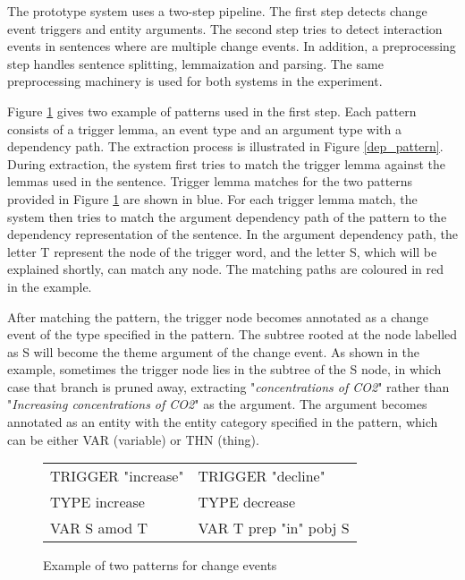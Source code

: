 The prototype system uses a two-step pipeline. The first step detects change event triggers and entity arguments. The second step tries to detect interaction events in sentences where are multiple change events. In addition, a preprocessing step handles sentence splitting, lemmaization and parsing. The same preprocessing machinery is used for both systems in the experiment.

Figure \ref{pattern_exmpl} gives two example of patterns used in the first step. Each pattern consists of a trigger lemma, an event type and an argument type with a dependency path. The extraction process is illustrated in Figure \ref{dep_pattern}. During extraction, the system first tries to match the trigger lemma against the lemmas used in the sentence. Trigger lemma matches for the two patterns provided in Figure \ref{pattern_exmpl} are shown in blue. For each trigger lemma match, the system then tries to match the argument dependency path of the pattern to the dependency representation of the sentence. In the argument dependency path, the letter T represent the node of the trigger word, and the letter S, which will be explained shortly, can match any node. The matching paths are coloured in red in the example. 

After matching the pattern, the trigger node becomes annotated as a change event of the type specified in the pattern. The subtree rooted at the node labelled as S will become the theme argument of the change event. As shown in the example, sometimes the trigger node lies in the subtree of the S node, in which case that branch is pruned away, extracting "\emph{concentrations of CO2}" rather than "\emph{Increasing concentrations of CO2}" as the argument. The argument becomes annotated as an entity with the entity category specified in the pattern, which can be either VAR (variable) or THN (thing). 

\begin{figure}
\begin{center}
\begin{tabular}{  l  l  }
TRIGGER "increase"	& TRIGGER "decline" \\
TYPE increase & TYPE decrease \\
VAR S amod T & VAR T prep "in" pobj S \\
\end{tabular}
\end{center}
\caption{Example of two patterns for change events}
\label{pattern_exmpl}
\end{figure}

